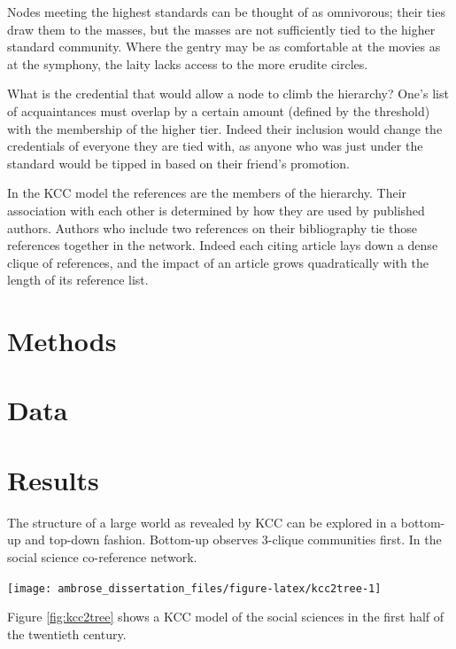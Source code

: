 \documentclass[]{book}
\theoremstyle{definition}
\theoremstyle{definition}
\theoremstyle{definition}
\theoremstyle{remark}
\begin{document}
Nodes meeting the highest standards can be thought of as omnivorous;
their ties draw them to the masses, but the masses are not sufficiently
tied to the higher standard community. Where the gentry may be as
comfortable at the movies as at the symphony, the laity lacks access to
the more erudite circles.

What is the credential that would allow a node to climb the hierarchy?
One's list of acquaintances must overlap by a certain amount (defined by
the threshold) with the membership of the higher tier. Indeed their
inclusion would change the credentials of everyone they are tied with,
as anyone who was just under the standard would be tipped in based on
their friend's promotion.

In the KCC model the references are the members of the hierarchy. Their
association with each other is determined by how they are used by
published authors. Authors who include two references on their
bibliography tie those references together in the network. Indeed each
citing article lays down a dense clique of references, and the impact of
an article grows quadratically with the length of its reference list.

\hypertarget{methods}{%
\section{Methods}\label{methods}}

\hypertarget{data-1}{%
\section{Data}\label{data-1}}

\hypertarget{results-1}{%
\section{Results}\label{results-1}}

The structure of a large world as revealed by KCC can be explored in a
bottom-up and top-down fashion. Bottom-up observes 3-clique communities
first. In the social science co-reference network.

\begin{center}\texttt{[image: ambrose\_dissertation\_files/figure-latex/kcc2tree-1]} \end{center}

Figure \ref{fig:kcc2tree} shows a KCC model of the social sciences in
the first half of the twentieth century.
\end{document}
